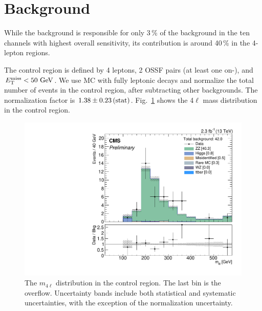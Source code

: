 \section{\texorpdfstring{\ZZ}{ZZ} Background}
\label{sec:bkg_ZZ}

While the \ZZ background is responsible for only 3\,\% of the background in the ten channels with highest overall sensitivity, its contribution is around 40\,\% in the 4-lepton regions.

The control region is defined by 4 leptons, 2 OSSF pairs (at least one on-\Z), and $E_{\mathrm{T}}^{\text{miss}} < 50\,\,\text{Ge\hspace{-.08em}V}$. We use \ZZ MC with fully leptonic decays and normalize the total number of events in the control region, after subtracting other backgrounds. The normalization factor is $1.38 \pm 0.23\,\text{(stat)}$. Fig.~\ref{fig:ZZ} shows the 4$\ell$ mass distribution in the control region.

\begin{figure}
\begin{center}
	\includegraphics[width=.7\textwidth]{Background/bkg_ZZ/ZZ_DYz2MET0to50HT0to200_MLIGHTLEPTONS}
	\caption{The $m_{4\ell}$ distribution in the \ZZ control region. The last bin is the overflow. Uncertainty bands include both statistical and systematic uncertainties, with the exception of the \ZZ normalization uncertainty.
	\label{fig:ZZ}}
\end{center}
\end{figure}
